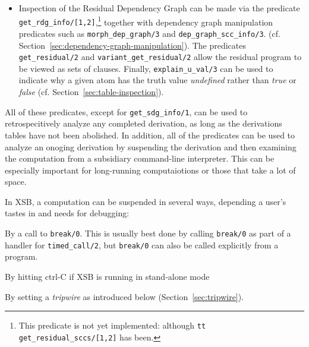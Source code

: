\begin{itemize}
\item Inspection of the Residual Dependency Graph can be made via the
  predicate {\tt get\_rdg\_info/[1,2]},\footnote{This predicate is not
    yet implemented: although {\tt tt get\_residual\_sccs/[1,2]} has
    been.} together with dependency graph manipulation predicates such
  as {\tt morph\_dep\_graph/3} and {\tt dep\_graph\_scc\_info/3}.
  (cf. Section~\ref{sec:dependency-graph-manipulation}).  The
  predicates {\tt get\_residual/2} and {\tt variant\_get\_residual/2}
  allow the residual program to be viewed as sets of clauses.
  Finally, {\tt explain\_u\_val/3} can be used to indicate why a given
  atom has the truth value {\em undefined} rather than {\em true} or
  {\em false} (cf. Section~\ref{sec:table-inspection}).
\end{itemize}

All of these predicates, except for {\tt get\_sdg\_info/1}, can be
used to retrospecitively analyze any completed derivation, as long as
the derivations tables have not been abolished.  In addition, all of
the predicates can be used to analyze an onoging derivation by
suspending the derivation and then examining the computation from a
subsidiary command-line interpreter.  This can be especially important
for long-running computaiotions or those that take a lot of space.

In XSB, a computation can be suspended in several ways, depending a
user's tastes in and needs for debugging:

\bi 
\item By a call to {\tt break/0}.  This is usually best done by
  calling {\tt break/0} as part of a handler for {\tt timed\_call/2},
  but {\tt break/0} can also be called explicitly from a program.
%
\item By hitting ctrl-C if XSB is running in stand-alone mode

\item By setting a {\em tripwire} as introduced below
  (Section~\ref{sec:tripwire}).  
%
\ei

